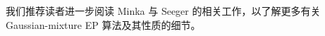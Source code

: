 \begin{tcolorbox}
\begin{exam}
    我们推荐读者进一步阅读 Minka 与 Seeger 的相关工作，以了解更多有关 Gaussian-mixture EP 算法及其性质的细节。
\end{exam}
\end{tcolorbox}
